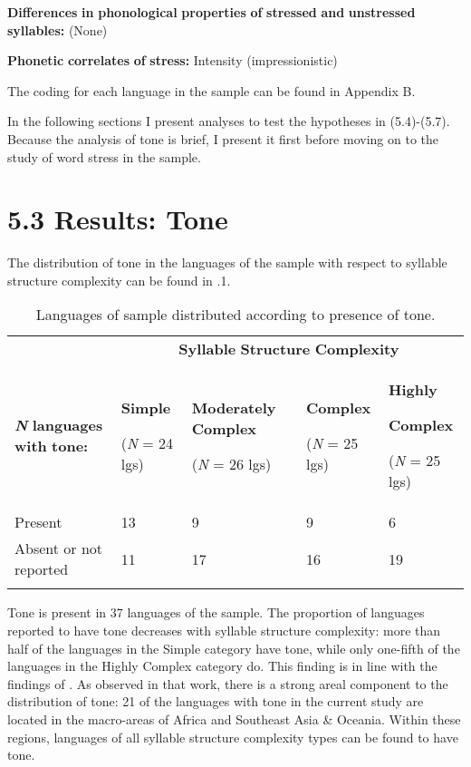 \textbf{Differences} \textbf{in} \textbf{phonological} \textbf{properties} \textbf{of} \textbf{stressed} \textbf{and} \textbf{unstressed} \textbf{syllables:} (None)



\textbf{Phonetic} \textbf{correlates} \textbf{of} \textbf{stress:} Intensity (impressionistic)


\z

The coding for each language in the sample can be found in Appendix B.



  In the following sections I present analyses to test the hypotheses in (5.4)-(5.7). Because the analysis of tone is brief, I present it first before moving on to the study of word stress in the sample.


\section{5.3 Results: Tone}

  The distribution of tone in the languages of the sample with respect to syllable structure complexity can be found in .1.






\begin{table}
\begin{tabularx}{\textwidth}{XXXXX}
\lsptoprule
 & \multicolumn{4}{c}{ \textbf{Syllable} \textbf{Structure} \textbf{Complexity}}\\
 \textbf{\textit{N}} \textbf{languages} \textbf{with} \textbf{tone:} & { \textbf{Simple}}

 (\textit{N} = 24 lgs) & { \textbf{Moderately} \textbf{Complex}}

 (\textit{N} = 26 lgs) & { \textbf{Complex}}

 (\textit{N} = 25 lgs) & { \textbf{Highly} }

{ \textbf{Complex}}

 (\textit{N} = 25 lgs)\\
 Present & 13 & 9 & 9 & 6\\
 Absent or not reported & 11 & 17 & 16 & 19\\
\lspbottomrule
\end{tabularx}
\caption{\label{5.1}Languages of sample distributed according to presence of tone.}
\end{table}




  Tone is present in 37 languages of the sample. The proportion of languages reported to have tone decreases with syllable structure complexity: more than half of the languages in the Simple category have tone, while only one-fifth of the languages in the Highly Complex category do. This finding is in line with the findings of \citet{Maddieson2013d}. As observed in that work, there is a strong areal component to the distribution of tone: 21 of the languages with tone in the current study are located in the macro-areas of Africa and Southeast Asia \& Oceania. Within these regions, languages of all syllable structure complexity types can be found to have tone.



